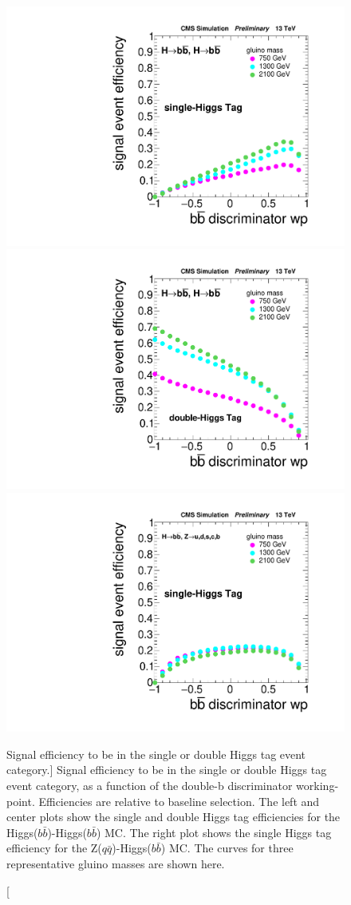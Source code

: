 \begin{figure}
\centering
\includegraphics[width=0.32\linewidth]{figs/SingleHiggsTagHH.pdf}
\includegraphics[width=0.32\linewidth]{figs/DoubleHiggsTagHH.pdf}
\includegraphics[width=0.32\linewidth]{figs/SingleHiggsTagZH.pdf} 
\caption
[Signal efficiency to be in the single or double Higgs tag event category.]
{Signal efficiency to be in the single or double Higgs tag event category, as a function of the double-b discriminator working-point. Efficiencies are relative to baseline selection. The left and center plots show the single and double Higgs tag efficiencies for the Higgs($b\bar{b}$)-Higgs($b\bar{b}$) MC. The right plot shows the single Higgs tag efficiency for the Z($q\bar{q}$)-Higgs($b\bar{b}$) MC. The curves for three representative gluino masses are shown here.
}
\label{fig:HSignalEff}
\end{figure}





